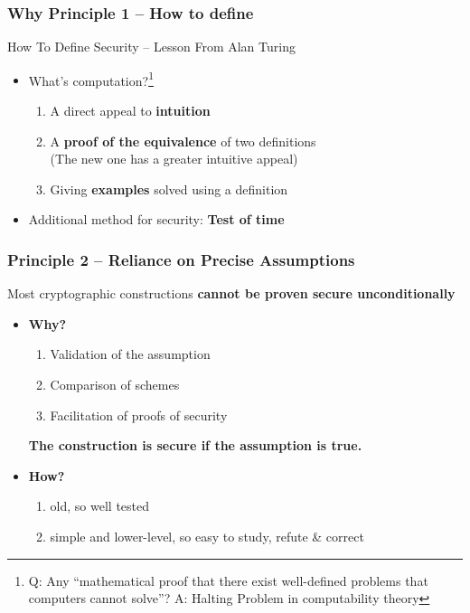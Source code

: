 \begin{frame}\frametitle{Why Principle 1 -- How to define}

How To Define Security -- Lesson From Alan Turing
\begin{itemize}
\item What's computation?\footnote{Q: Any ``mathematical proof that there exist well-defined problems that computers cannot solve''? A: Halting Problem in computability theory}
\begin{enumerate}
\item A direct appeal to \textbf{intuition}
\item A \textbf{proof of the equivalence} of two definitions\\ (The new one has a greater intuitive appeal)
\item Giving \textbf{examples} solved using a definition
\end{enumerate}
\item Additional method for security: \textbf{Test of time}
\end{itemize}
\end{frame}	
\begin{frame}\frametitle{Principle 2 -- Reliance on Precise Assumptions}
Most cryptographic constructions \textbf{cannot be proven secure unconditionally}
\begin{itemize}
	\item \textbf{Why?} 
	\begin{enumerate}
		\item Validation of the assumption
		\item Comparison of schemes
		\item Facilitation of proofs of security
	\end{enumerate}
	\textbf{The construction is secure if the assumption is true.}
	\item \textbf{How?} 
	\begin{enumerate}
		\item old, so well tested
		\item simple and lower-level, so easy to study, refute \& correct
	\end{enumerate}
\end{itemize}
\end{frame}
